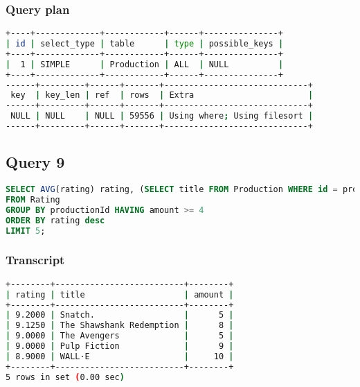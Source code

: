 \subsubsection{Query plan}
\begin{lstlisting}[language=bash]
+----+-------------+------------+------+---------------+
| id | select_type | table      | type | possible_keys |
+----+-------------+------------+------+---------------+
|  1 | SIMPLE      | Production | ALL  | NULL          |
+----+-------------+------------+------+---------------+
------+---------+------+-------+-----------------------------+
 key  | key_len | ref  | rows  | Extra                       |
------+---------+------+-------+-----------------------------+
 NULL | NULL    | NULL | 59556 | Using where; Using filesort |
------+---------+------+-------+-----------------------------+
\end{lstlisting}


\bigskip
\subsection{Query 9}
\begin{lstlisting}[language=sql]
SELECT AVG(rating) rating, (SELECT title FROM Production WHERE id = productionId) title, COUNT(*) amount
FROM Rating
GROUP BY productionId HAVING amount >= 4
ORDER BY rating desc
LIMIT 5;
\end{lstlisting}
\subsubsection{Transcript}
\begin{lstlisting}[language=bash]
+--------+--------------------------+--------+
| rating | title                    | amount |
+--------+--------------------------+--------+
| 9.2000 | Snatch.                  |      5 |
| 9.1250 | The Shawshank Redemption |      8 |
| 9.0000 | The Avengers             |      5 |
| 9.0000 | Pulp Fiction             |      9 |
| 8.9000 | WALL·E                   |     10 |
+--------+--------------------------+--------+
5 rows in set (0.00 sec)
\end{lstlisting}

